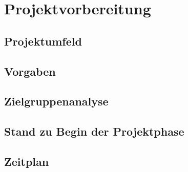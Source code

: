 \section{Projektvorbereitung} 
\label{sec:Projektvorbereitung}
\subsection{Projektumfeld}
\label{sec:Projektumfeld}
\subsection{Vorgaben}
\label{sec:Vorgaben}
\subsection{Zielgruppenanalyse}
\label{sec:Zielgruppenanalyse}
\subsection{Stand zu Begin der Projektphase}
\label{sec:StandZuBeginDerProjektphase}
\subsection{Zeitplan}
\label{sec:Zeitplan}